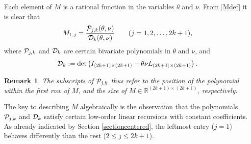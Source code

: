 \documentclass[a4paper]{article}
\newtheorem{remark}{Remark}
\newcommand{\te}{\theta}
\newcommand{\cP}{{\cal{P}}}
\newcommand{\cD}{{\cal{D}}}
\begin{document}
Each element of $M$ is a rational function in the variables $\te$ and $\nu$. From \eqref{Mdef} it is clear that 
\begin{equation}\label{M1jPjkDk}
M_{1,j}=\frac{\cP_{j,k}(\te,\nu) }{\cD_k(\te,\nu)}\quad\quad(j=1,2,\ldots,2k+1),
\end{equation}
where $\cP_{j,k}$ and $\cD_{k}$ are certain bivariate polynomials in $\te$ and $\nu$, and 
\begin{equation}\label{dendet}
\cD_k:=\det\left(I_{(2k+1)\times(2k+1)}-\te\nu L_{(2k+1)\times(2k+1)}\right).
\end{equation}
\begin{remark}
The subscripts of $\cP_{j,k}$ thus refer to the position of the polynomial within the first row of $M$, and the size of $M\in\mathbb{R}^{(2k+1)\times(2k+1)}$, respectively.
\end{remark}


The key to describing $M$ algebraically is the observation that the polynomials $\cP_{j,k}$ and $\cD_{k}$ satisfy certain low-order linear recursions with constant coefficients. As already indicated by Section \ref{sectioncentered}, the leftmost entry ($j=1$) behaves differently than the rest ($2\le j\le 2k+1$).
\end{document}
